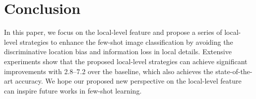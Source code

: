 \documentclass{article}
\begin{document}
\begin{table}[h]
    \small
	\setlength{\abovecaptionskip}{0.0cm}
	\setlength{\abovecaptionskip}{0.0cm}
	\setlength{\belowcaptionskip}{0.1cm}
\end{table}











\section{Conclusion}
In this paper, we focus on the local-level feature and propose a series of local-level strategies to enhance the few-shot image classification by avoiding the discriminative location bias and information loss in local details. Extensive experiments show that the proposed local-level strategies can achieve significant improvements with 2.8–7.2 over the baseline, which also achieves the state-of-the-art accuracy. We hope our proposed new perspective on the local-level feature can inspire future works in few-shot learning.
\end{document}
